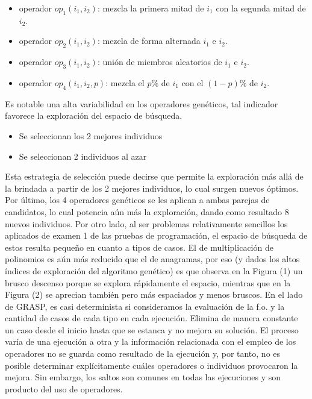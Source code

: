 \documentclass[a4paper,11pt]{article}
\begin{document}
			\begin{itemize}
				\item operador $op_1(i_1, i_2)$: mezcla la primera mitad de $i_1$ con la segunda mitad de $i_2$.
				\item operador $op_2(i_1, i_2)$: mezcla de forma alternada $i_1$ e $i_2$.
				\item operador $op_3(i_1, i_2)$: unión de miembros aleatorios de $i_1$ e $i_2$.
				\item operador $op_4(i_1, i_2, p)$: mezcla el $p\%$ de $i_1$ con el $(1-p)\%$ de $i_2$.
			\end{itemize}
		
			Es notable una alta variabilidad en los operadores genéticos, tal indicador favorece la exploración del espacio de búsqueda.
			
			\begin{itemize}
				\item Se seleccionan los 2 mejores individuos
				\item Se seleccionan 2 individuos al azar
			\end{itemize}
		
			Esta estrategia de selección puede decirse que permite la exploración más allá de la brindada a partir de los 2 mejores individuos, lo cual surgen nuevos óptimos.
			Por último, los 4 operadores genéticos se les aplican a ambas parejas de candidatos, lo cual potencia aún más la exploración, dando como resultado 8 nuevos individuos.
			Por otro lado, al ser problemas relativamente sencillos los aplicados de examen 1 de las pruebas de programación, el espacio de búsqueda de estos resulta pequeño en cuanto a tipos de casos.  El de multiplicación de polinomios es aún más reducido que el de anagramas, por eso (y dados los altos índices de exploración del algoritmo genético) es que observa en la Figura (1) un brusco descenso porque se explora rápidamente el espacio, mientras que en la Figura (2) se aprecian también pero más espaciados y menos bruscos.
			En el lado de GRASP, es casi determinista si consideramos la evaluación de la f.o. y la cantidad de casos de cada tipo en cada ejecución. Elimina de manera constante un caso desde el inicio hasta que se estanca y no mejora su solución.
			El proceso varía de una ejecución a otra y la información relacionada con el empleo de los operadores no se guarda como resultado de la ejecución y, por tanto, no es posible determinar explícitamente cuáles operadores o individuos provocaron la mejora. Sin embargo, los saltos son comunes en todas las ejecuciones y son producto del uso de operadores.
			
\end{document}

